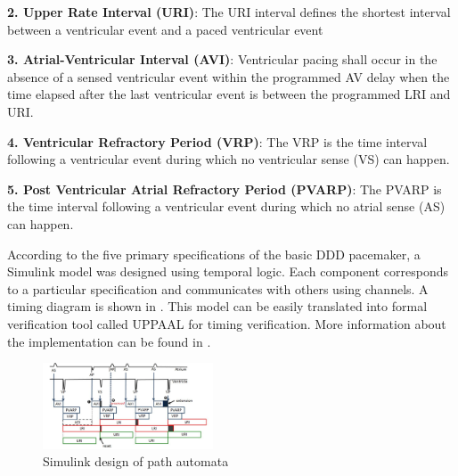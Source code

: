 \textbf{2. Upper Rate Interval (URI)}:
The URI interval defines the shortest interval between a ventricular event and a paced ventricular event

\textbf{3. Atrial-Ventricular Interval (AVI)}:
Ventricular pacing shall occur in the absence of a sensed ventricular event within the programmed AV delay when the time elapsed after the last ventricular event is between the programmed LRI and URI.

\textbf{4. Ventricular Refractory Period (VRP)}:
The VRP is the time interval following a ventricular event during which no ventricular sense (VS) can happen.

\textbf{5. Post Ventricular Atrial Refractory Period (PVARP)}:
The PVARP is the time interval following a ventricular event during which no atrial sense (AS) can happen.

According to the five primary specifications of the basic DDD pacemaker, a Simulink model was designed using temporal logic. Each component corresponds to a particular specification and communicates with others using channels. A timing diagram is shown in . This model can be easily translated into formal verification tool called UPPAAL for timing verification. More information about the implementation can be found in \cite{STTT13}. 

\begin{figure}[!b]
\center
\vspace{-10pt}
\includegraphics[width=0.45\textwidth]{figures/PM_timers.pdf}
\vspace{-10pt}
\caption{Simulink design of path automata}
\label{fig:timingPM}
\end{figure}



